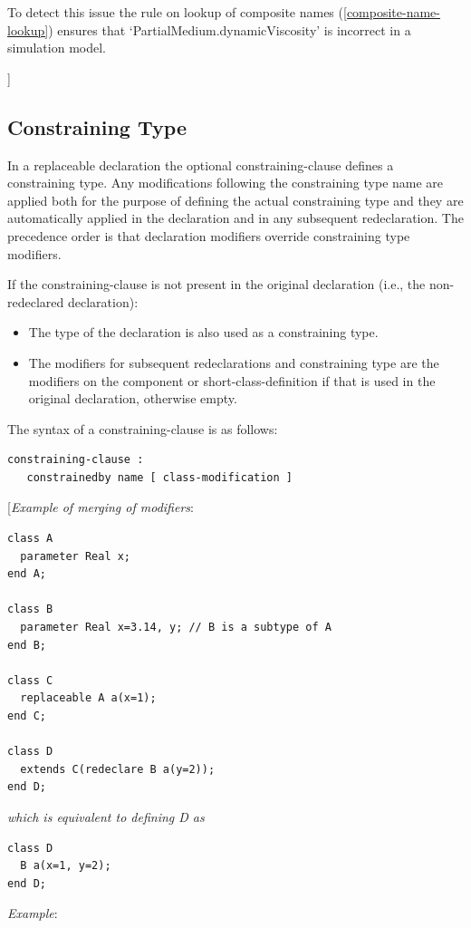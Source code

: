 \documentclass[10pt,a4paper]{report}
\def\doublelabel#1{\label{#1}\hypertarget{#1}{}}
\begin{document}
To detect this issue the rule on lookup of composite names (\ref{composite-name-lookup}) 
ensures that `PartialMedium.dynamicViscosity' is incorrect in a
simulation model.

{]}

\subsection{Constraining Type}\doublelabel{constraining-type}

In a replaceable declaration the optional constraining-clause defines a
constraining type. Any modifications following the constraining type
name are applied both for the purpose of defining the actual
constraining type and they are automatically applied in the declaration
and in any subsequent redeclaration. The precedence order is that
declaration modifiers override constraining type modifiers.

If the constraining-clause is not present in the original declaration
(i.e., the non-redeclared declaration):

\begin{itemize}
\item
  The type of the declaration is also used as a constraining type.
\item
  The modifiers for subsequent redeclarations and constraining type are
  the modifiers on the component or short-class-definition if that is
  used in the original declaration, otherwise empty.
\end{itemize}

The syntax of a constraining-clause is as follows:
\begin{lstlisting}[language=grammar]
constraining-clause :
   constrainedby name [ class-modification ]
\end{lstlisting}
{[}\emph{Example of merging of modifiers}:
\begin{lstlisting}[language=modelica]
class A
  parameter Real x;
end A;
  
class B
  parameter Real x=3.14, y; // B is a subtype of A
end B;

class C
  replaceable A a(x=1);
end C;

class D
  extends C(redeclare B a(y=2));
end D;
\end{lstlisting}

\emph{which is equivalent to defining D as }
\begin{lstlisting}[language=modelica]
class D
  B a(x=1, y=2);
end D;
\end{lstlisting}
\emph{Example}:
\end{document}
